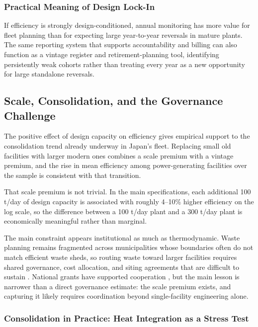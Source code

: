 \documentclass[12pt,a4paper]{article}
\begin{document}
\subsubsection{Practical Meaning of Design Lock-In}

If efficiency is strongly design-conditioned, annual monitoring has more value for fleet planning than for expecting large year-to-year reversals in mature plants. The same reporting system that supports accountability and billing can also function as a vintage register and retirement-planning tool, identifying persistently weak cohorts rather than treating every year as a new opportunity for large standalone reversals.

\subsection{Scale, Consolidation, and the Governance Challenge}

The positive effect of design capacity on efficiency gives empirical support to the consolidation trend already underway in Japan's fleet. Replacing small old facilities with larger modern ones combines a scale premium with a vintage premium, and the rise in mean efficiency among power-generating facilities over the sample is consistent with that transition.

That scale premium is not trivial. In the main specifications, each additional 100 t/day of design capacity is associated with roughly 4--10\% higher efficiency on the log scale, so the difference between a 100 t/day plant and a 300 t/day plant is economically meaningful rather than marginal.

The main constraint appears institutional as much as thermodynamic. Waste planning remains fragmented across municipalities whose boundaries often do not match efficient waste sheds, so routing waste toward larger facilities requires shared governance, cost allocation, and siting agreements that are difficult to sustain \citep{Sakai2008, TabataTsai2016, Sun2018}. National grants have supported cooperation \citep{MOEJ2024}, but the main lesson is narrower than a direct governance estimate: the scale premium exists, and capturing it likely requires coordination beyond single-facility engineering alone.

\subsubsection{Consolidation in Practice: Heat Integration as a Stress Test}
\end{document}
